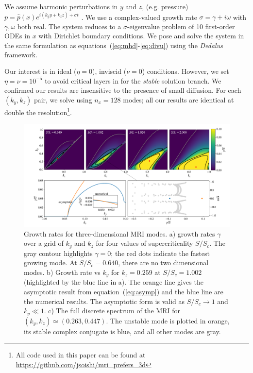 \documentclass[aps,prl,reprint,superscriptaddress]{revtex4-1}
\newcommand{\SSC}{S/S_{c}}
\begin{document}
We assume harmonic perturbations in $y$ and $z$, (e.g. pressure) $p = \hat{p}(x) e^{i(k_y y + k_z z) + \sigma t}$ . 
We use a complex-valued growth rate $\sigma = \gamma + i\omega$ with $\gamma, \omega$ both real. 
The system reduces to a $\sigma$-eigenvalue problem of 10 first-order ODEs in $x$ with Dirichlet boundary conditions.
We pose and solve the system in the same formulation as equations~(\ref{eq:mhd}-\ref{eq:divu}) using the \emph{Dedalus} framework. 

Our interest is in ideal ($\eta = 0$), inviscid ($\nu = 0$) conditions.
However, we set $\eta=\nu=10^{-5}$ to avoid critical layers in for the \textit{stable} solution branch.
We confirmed our results are insensitive to the presence of small diffusion. 
For each $(k_y, k_z)$ pair, we solve using $n_x = 128$ modes; all our results are identical at double the resolution\footnote{All code used in this paper can be found at \protect\url{https://github.com/jsoishi/mri\_prefers\_3d}}.
\begin{figure}[ht]
  \includegraphics[width=\textwidth]{fig_1.pdf}
  \caption{Growth rates for three-dimensional MRI modes. a) growth rates $\gamma$ over a grid of $k_y$ and $k_z$ for four values of supercriticality $\SSC$. The gray contour highlights $\gamma = 0$; the red dots indicate the fastest growing mode. At $\SSC = 0.640$, there are no two dimensional modes. b) Growth rate vs $k_y$ for $k_z = 0.259$ at $\SSC = 1.002$ (highlighted by the blue line in a). The orange line gives the asymptotic result from equation~(\ref{eq:asymp}) and the blue line are the numerical results. The asymptotic form is valid as $\SSC \to 1$ and $k_y \ll 1$. c) The full discrete spectrum of the MRI for $(k_y, k_z) \simeq (0.263, 0.447)$. The unstable mode is plotted in orange, its stable complex conjugate is blue, and all other modes are gray.}
  \label{fig:growth_rate}
\end{figure}
\end{document}
